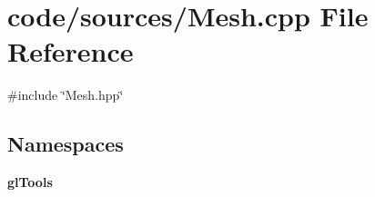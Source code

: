 \section{code/sources/\+Mesh.cpp File Reference}
\label{_mesh_8cpp}
{\ttfamily \#include \char`\"{}Mesh.\+hpp\char`\"{}}\newline
\subsection*{Namespaces}
\begin{DoxyCompactItemize}
\item 
 \textbf{ gl\+Tools}
\end{DoxyCompactItemize}
